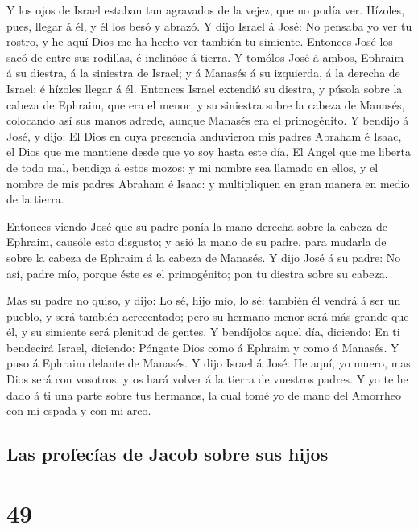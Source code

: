 Y los ojos de Israel estaban tan agravados de la vejez,
que no podía ver. Hízoles, pues, llegar á él, y él los besó y abrazó.
 Y dijo Israel á José: No pensaba yo ver tu rostro, y he
aquí Dios me ha hecho ver también tu simiente.  Entonces
José los sacó de entre sus rodillas, é inclinóse á tierra. 
Y tomólos José á ambos, Ephraim á su diestra, á la siniestra de Israel;
y á Manasés á su izquierda, á la derecha de Israel; é hízoles llegar á
él.  Entonces Israel extendió su diestra, y púsola sobre la
cabeza de Ephraim, que era el menor, y su siniestra sobre la cabeza de
Manasés, colocando así sus manos adrede, aunque Manasés era el
primogénito.  Y bendijo á José, y dijo: El Dios en cuya
presencia anduvieron mis padres Abraham é Isaac, el Dios que me mantiene
desde que yo soy hasta este día,  El Angel que me liberta
de todo mal, bendiga á estos mozos: y mi nombre sea llamado en ellos, y
el nombre de mis padres Abraham é Isaac: y multipliquen en gran manera
en medio de la tierra.

 Entonces viendo José que su padre ponía la mano derecha
sobre la cabeza de Ephraim, causóle esto disgusto; y asió la mano de su
padre, para mudarla de sobre la cabeza de Ephraim á la cabeza de
Manasés.  Y dijo José á su padre: No así, padre mío, porque
éste es el primogénito; pon tu diestra sobre su cabeza.

 Mas su padre no quiso, y dijo: Lo sé, hijo mío, lo sé:
también él vendrá á ser un pueblo, y será también acrecentado; pero su
hermano menor será más grande que él, y su simiente será plenitud de
gentes.  Y bendíjolos aquel día, diciendo: En ti bendecirá
Israel, diciendo: Póngate Dios como á Ephraim y como á Manasés. Y puso á
Ephraim delante de Manasés.  Y dijo Israel á José: He aquí,
yo muero, mas Dios será con vosotros, y os hará volver á la tierra de
vuestros padres.  Y yo te he dado á ti una parte sobre tus
hermanos, la cual tomé yo de mano del Amorrheo con mi espada y con mi
arco.

\hypertarget{las-profecuxedas-de-jacob-sobre-sus-hijos}{%
\subsection{Las profecías de Jacob sobre sus
hijos}\label{las-profecuxedas-de-jacob-sobre-sus-hijos}}

\hypertarget{section-48}{%
\section{49}\label{section-48}}


